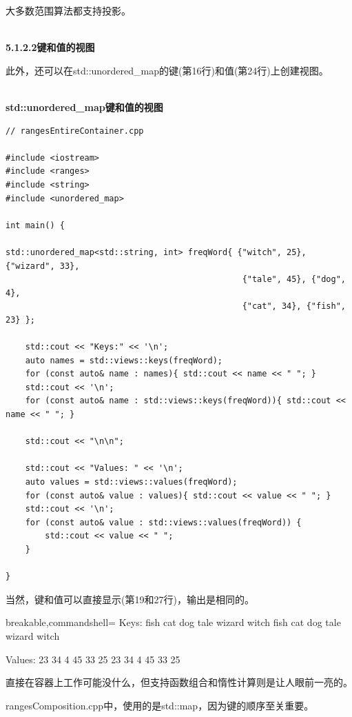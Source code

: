 大多数范围算法都支持投影。

\hspace*{\fill} \\ %
\noindent
\textbf{5.1.2.2\hspace{0.2cm}键和值的视图}

此外，还可以在std::unordered\_map的键(第16行)和值(第24行)上创建视图。

\hspace*{\fill} \\ %
\noindent
\textbf{std::unordered\_map键和值的视图}
\begin{lstlisting}[style=styleCXX]
// rangesEntireContainer.cpp

#include <iostream>
#include <ranges>
#include <string>
#include <unordered_map>

int main() {

std::unordered_map<std::string, int> freqWord{ {"witch", 25}, {"wizard", 33},
												{"tale", 45}, {"dog", 4},
												{"cat", 34}, {"fish", 23} };

	std::cout << "Keys:" << '\n';
	auto names = std::views::keys(freqWord);
	for (const auto& name : names){ std::cout << name << " "; }
	std::cout << '\n';
	for (const auto& name : std::views::keys(freqWord)){ std::cout << name << " "; }
	
	std::cout << "\n\n";

	std::cout << "Values: " << '\n';
	auto values = std::views::values(freqWord);
	for (const auto& value : values){ std::cout << value << " "; }
	std::cout << '\n';
	for (const auto& value : std::views::values(freqWord)) {
		std::cout << value << " ";
	}

}
\end{lstlisting}

当然，键和值可以直接显示(第19和27行)，输出是相同的。

\begin{tcblisting}{breakable,commandshell={}}
Keys:
fish cat dog tale wizard witch
fish cat dog tale wizard witch

Values:
23 34 4 45 33 25
23 34 4 45 33 25
\end{tcblisting}

直接在容器上工作可能没什么，但支持函数组合和惰性计算则是让人眼前一亮的。


rangesComposition.cpp中，使用的是std::map，因为键的顺序至关重要。

